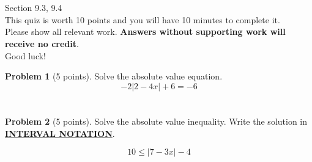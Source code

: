 \documentclass[11pt]{article}
\theoremstyle{definition}
\newtheorem{problem}{Problem}
\begin{document}
\section*{}
Section 9.3, 9.4\\
This quiz is worth 10 points and you will have 10 minutes to complete it.\\
Please show all relevant work. \textbf{Answers without supporting work will receive no credit}.\\
Good luck!
\begin{problem}[5 points] Solve the absolute value equation.
\[-2\vert 2-4x\vert +6=-6 \]


\end{problem}

\vspace{2in}

\section*{}
\begin{problem}[5 points] Solve the absolute value inequality. Write the solution in \underline{\Large\textbf{INTERVAL NOTATION}}.

\[10\leq \vert 7-3x\vert-4\]

\end{problem}
\end{document}
